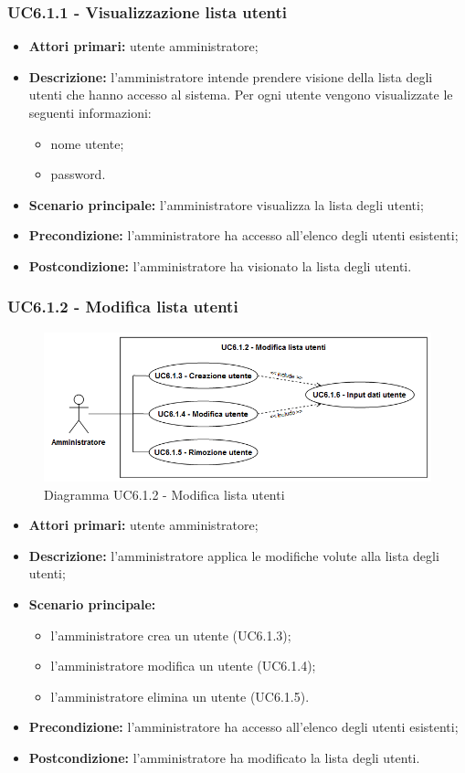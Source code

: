 \subsubsection{UC6.1.1 - Visualizzazione lista utenti}
\begin{itemize}
	\item \textbf{Attori primari:} utente amministratore;
	\item \textbf{Descrizione:} l'amministratore intende prendere visione della lista degli utenti che hanno accesso al sistema. Per ogni utente vengono visualizzate le seguenti informazioni:
		\begin{itemize}
			\item nome utente;
			\item password.
		\end{itemize}
	\item \textbf{Scenario principale:} l'amministratore visualizza la lista degli utenti;
	\item \textbf{Precondizione:} l'amministratore ha accesso all'elenco degli utenti esistenti;
	\item \textbf{Postcondizione:} l'amministratore ha visionato la lista degli utenti.
\end{itemize}

\subsubsection{UC6.1.2 - Modifica lista utenti}
	\begin{figure}[H]
		\centering
		\includegraphics[width=14cm]{images/UC6.1.2.png}
		\caption{Diagramma UC6.1.2 - Modifica lista utenti}
	\end{figure}
	\begin{itemize}
		\item \textbf{Attori primari:} utente amministratore;
		\item \textbf{Descrizione:} l'amministratore applica le modifiche volute alla lista degli utenti;
		\item \textbf{Scenario principale:} 
		\begin{itemize}
			\item l'amministratore crea un utente (UC6.1.3);
			\item l'amministratore modifica un utente (UC6.1.4);
			\item l'amministratore elimina un utente (UC6.1.5).
		\end{itemize}
		\item \textbf{Precondizione:} l'amministratore ha accesso all'elenco degli utenti esistenti;
		\item \textbf{Postcondizione:} l'amministratore ha modificato la lista degli utenti.
	\end{itemize}

